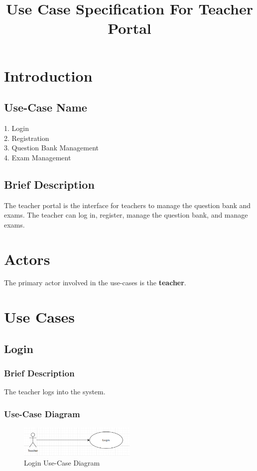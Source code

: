 \documentclass{article}
\title{Use Case Specification For Teacher Portal}
\author{}
\date{}
\begin{document}
\maketitle

\section{Introduction}
\subsection{Use-Case Name}
1. Login\\
2. Registration\\
3. Question Bank Management\\
4. Exam Management


\subsection{Brief Description}
The teacher portal is the interface for teachers to manage the question bank and exams. The teacher can log in, register, manage the question bank, and manage exams.
\section{Actors}
The primary actor involved in the use-cases is the \textbf{teacher}.

\section{Use Cases}

\subsection{Login}

\subsubsection{Brief Description}
The teacher logs into the system.
\subsubsection{Use-Case Diagram}
\begin{figure}[h]
    \centering
    \includegraphics[width=0.5\textwidth]{login.png}
    \caption{Login Use-Case Diagram}
\end{figure}
\end{document}

